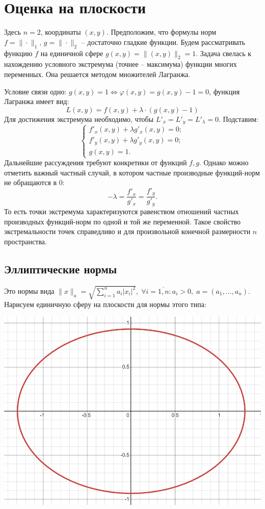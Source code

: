 \documentclass{article}
\begin{document}
\newpage
\section{Оценка на плоскости} \label{3}

Здесь $n=2$, координаты $(x,y)$. Предположим, что формулы норм $f = \|\cdot\|_1, \, g = \|\cdot\|_2$ -- достаточно гладкие функции. Будем рассматривать функцию $f$ на единичной сфере $g(x,y) = \|(x,y)\|_2 = 1$. Задача свелась к нахождению условного экстремума (точнее -- максимума) функции многих переменных. Она решается методом множителей Лагранжа.

Условие связи одно: $g(x,y) = 1 \Leftrightarrow \varphi(x,y) = g(x,y) - 1 = 0$, функция Лагранжа имеет вид:
$$ L(x,y) = f(x,y) + \lambda \cdot (g(x,y) - 1) $$
Для достижения экстремума необходимо, чтобы $L'_x = L'_y = L'_{\lambda} = 0$. Подставим:
\begin{equation}\label{eq:l2}
	\begin{cases}
		f'_x(x,y)+\lambda g'_x(x,y) = 0; \\
		f'_y(x,y)+\lambda g'_y(x,y) = 0; \\
		g(x,y) = 1.
	\end{cases}
\end{equation}
Дальнейшие рассуждения требуют конкретики от функций $f, g$. Однако можно отметить важный частный случай, в котором частные производные функций-норм не обращаются в 0:
$$ -\lambda = \frac{f'_x}{g'_x} = \frac{f'_y}{g'_y}. $$
То есть точки экстремума характеризуются равенством отношений частных производных функций-норм по одной и той же переменной. Такое свойство экстремальности точек справедливо и для произвольной конечной размерности $n$ пространства.
\subsection{Эллиптические нормы}
Это нормы вида $\|x\|_a = \sqrt{\sum\limits_{i=1}^n a_i|x_i|^2}, \; \forall{i=\overline{1,n}}: a_i > 0, \; a = (a_1,...,a_n)$. Нарисуем единичную сферу на плоскости для нормы этого типа:

\begin{center}
\includegraphics[scale=0.55]{ellipse.png} 
\end{center}
\end{document}
